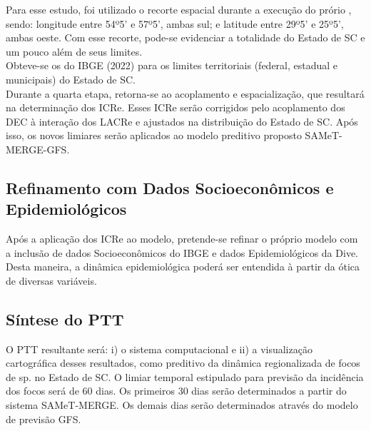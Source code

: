 \indent Para esse estudo, foi utilizado o recorte espacial durante a execução do prório , sendo: longitude entre 54º5' e 57º5', ambas sul; e latitude entre 29º5' e 25º5', ambas oeste. Com esse recorte, pode-se evidenciar a totalidade do Estado de \acrlong{SC} e um pouco além de seus limites.\\
\indent Obteve-se os  do \acrshort{IBGE} (2022) para os limites territoriais (federal, estadual e municipais) do Estado de \acrlong{SC}.\\

\indent Durante a quarta etapa, retorna-se ao acoplamento e espacialização, que resultará na determinação dos \acrfull{ICRe}. Esses \acrshort{ICRe} serão corrigidos pelo acoplamento dos \acrshort{DEC} à interação dos \acrshort{LACRe} e ajustados na distribuição do Estado de \acrlong{SC}. Após isso, os novos limiares serão aplicados ao modelo preditivo proposto \acrshort{SAMeT}-\acrshort{MERGE}-\acrshort{GFS}.


\subsection{Refinamento com Dados Socioeconômicos e Epidemiológicos}

\indent Após a aplicação dos \acrshort{ICRe} ao modelo, pretende-se refinar o próprio modelo com a inclusão de dados Socioeconômicos do \acrshort{IBGE} e dados Epidemiológicos da \acrshort{Dive}. Desta maneira, a dinâmica epidemiológica poderá ser entendida à partir da ótica de diversas variáveis.


\subsection{Síntese do \acrfull{PTT}} 

\indent O \acrshort{PTT} resultante será: i) o sistema computacional e ii) a visualização cartográfica desses resultados, como preditivo da dinâmica regionalizada de focos de  sp. no Estado de \acrlong{SC}. O limiar temporal estipulado para previsão da incidência dos focos será de 60 dias. Os primeiros 30 dias serão determinados a partir do sistema \acrshort{SAMeT}-\acrshort{MERGE}. Os demais dias serão determinados através do modelo de previsão \acrshort{GFS}.




